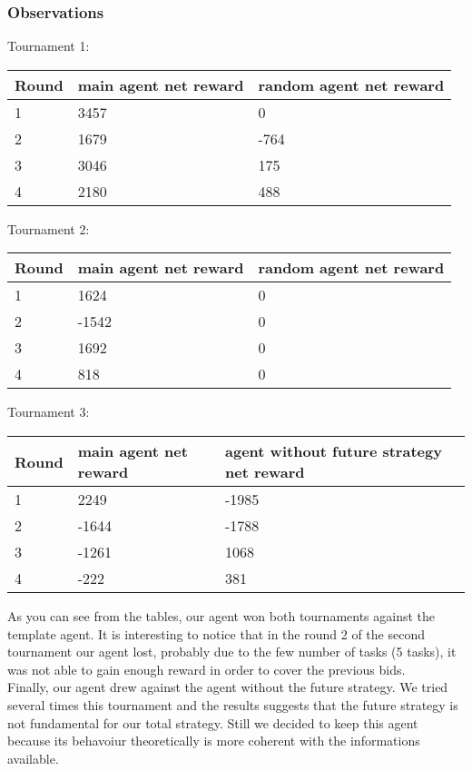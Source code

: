 \documentclass[11pt]{article}
\begin{document}
\subsubsection{Observations}
Tournament 1:
\\
\small
\begin{center}
    \begin{tabular}{ | l | l | l |}
    \hline
    \textbf{Round} & \textbf{main agent net reward} & \textbf{random agent net reward}\\ \hline
    1 &  3457 & 0\\ \hline
    2 &  1679 & -764\\ \hline
    3 &  3046 & 175\\ \hline
    4 &  2180 & 488\\ \hline
    \end{tabular}
\end{center}
\normalsize
Tournament 2:
\\
\small
\begin{center}
    \begin{tabular}{ | l | l | l |}
    \hline
    \textbf{Round} & \textbf{main agent net reward} & \textbf{random agent net reward}\\ \hline
    1 &  1624 & 0\\ \hline
    2 &  -1542 & 0\\ \hline
    3 &  1692 & 0\\ \hline
    4 &  818 & 0\\ \hline
    \end{tabular}
\end{center}
\normalsize
Tournament 3:
\\
\small
\begin{center}
    \begin{tabular}{ | l | l | l |}
    \hline
    \textbf{Round} & \textbf{main agent net reward} & \textbf{agent without future strategy net reward}\\ \hline
    1 &  2249 & -1985\\ \hline
    2 &  -1644 & -1788\\ \hline
    3 &  -1261 & 1068\\ \hline
    4 &  -222 & 381\\ \hline
    \end{tabular}
\end{center}
\normalsize
As you can see from the tables, our agent won both tournaments against the template agent. It is interesting to notice that in the round 2 of the second tournament our agent lost, probably due to the few number of tasks (5 tasks), it was not able to gain enough reward in order to cover the previous bids.
\\
Finally, our agent drew against the agent without the future strategy. We tried several times this tournament and the results suggests that the future strategy is not fundamental for our total strategy. Still we decided to keep this agent because its behavoiur theoretically is more coherent with the informations
available.
\end{document}
